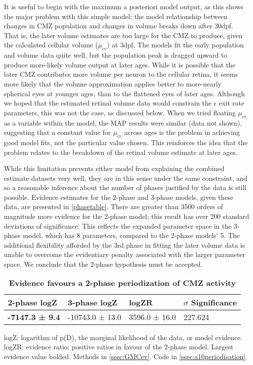 It is useful to begin with the maximum a posteriori model output, as this shows the major problem with this simple model; the model relationship between changes in CMZ population and changes in volume breaks down after 30dpf. That is, the later volume estimates are too large for the CMZ to produce, given the calculated cellular volume ($\mu_{cv}$) at 3dpf. The models fit the early population and volume data quite well, but the population peak is dragged upward to produce more-likely volume output at later ages. While it is possible that the later CMZ contributes more volume per neuron to the cellular retina, it seems more likely that the volume approximation applies better to more-nearly spherical eyes at younger ages, than to the flattened eyes of later ages. Although we hoped that the estimated retinal volume data would constrain the $\epsilon$ exit rate parameters, this was not the case, as discussed below. When we tried floating $\mu_{cv}$ as a variable within the model, the MAP results were similar (data not shown), suggesting that a constant value for $\mu_{cv}$ across ages is the problem in achieving good model fits, not the particular value chosen. This reinforces the idea that the problem relates to the breakdown of the retinal volume estimate at later ages.

While this limitation prevents either model from explaining the combined estimate datasets very well, they are in this sense under the same constraint, and so a reasonable inference about the number of phases justified by the data is still possible. Evidence estimates for the 2-phase and 3-phase models, given these data, are presented in \autoref{phasetable}. There are greater than 3500 orders of magnitude more evidence for the 2-phase model; this result has over 200 standard deviations of significance. This reflects the expanded parameter space in the 3-phase model, which has 8 parameters, compared to the 2-phase models' 5. The additional flexibility afforded by the 3rd phase in fitting the later volume data is unable to overcome the evidentiary penalty associated with the larger parameter space. We conclude that the 2-phase hypothesis must be accepted.

\begin{table}[!ht]
    \centering
    \caption{{\bf Evidence favours a 2-phase periodization of CMZ activity}}
    \begin{tabular}{|l|l|l|l|} \hline 
        {\bf 2-phase logZ} & {\bf 3-phase logZ} & {\bf logZR} & {\bf $\sigma$ Significance}\\ \hline
        \textbf{-7147.3 ± 9.4} & -10743.0 ± 13.0 & 3596.0 ± 16.0 & 227.624\\ \hline
        \end{tabular}
    \begin{flushleft} logZ: logarithm of p(D), the marginal likelihood of the data, or model evidence. logZR: evidence ratio; positive ratios in favour of the 2-phase model. Largest evidence value bolded.
    Methods in \autoref{ssec:GMCev}.
    Code in \autoref{ssec:a10periodisation}.
    \end{flushleft}
    \label{phasetable}
\end{table}

